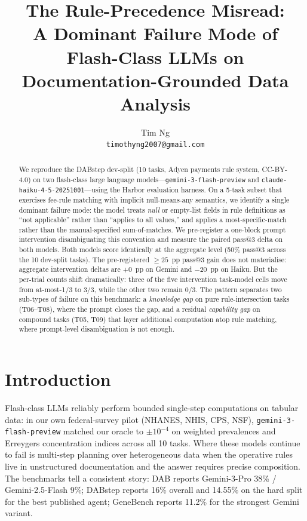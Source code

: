 \documentclass[11pt]{article}
\title{The Rule-Precedence Misread:\\
       A Dominant Failure Mode of Flash-Class LLMs on\\
       Documentation-Grounded Data Analysis}
\author{Tim Ng\\
        \texttt{timothyng2007@gmail.com}}
\date{}
\begin{document}
\maketitle

\begin{abstract}
We reproduce the DABstep dev-split (10 tasks, Adyen payments rule system, CC-BY-4.0) on two
flash-class large language models---\texttt{gemini-3-flash-preview} and
\texttt{claude-haiku-4-5-20251001}---using the Harbor evaluation harness. On a 5-task subset
that exercises fee-rule matching with implicit null-means-any semantics, we identify a single
dominant failure mode: the model treats \emph{null} or empty-list fields in rule definitions
as ``not applicable'' rather than ``applies to all values,'' and applies a most-specific-match
rather than the manual-specified sum-of-matches. We pre-register a one-block prompt
intervention disambiguating this convention and measure the paired pass@3 delta on both models.
Both models score identically at the aggregate level (50\% pass@3 across the 10 dev-split tasks).
The pre-registered $\geq 25$~pp pass@3 gain does not materialise: aggregate intervention deltas
are $+0$~pp on Gemini and $-20$~pp on Haiku. But the per-trial counts shift dramatically: three
of the five intervention task-model cells move from at-most-1/3 to 3/3, while the other two
remain 0/3. The pattern separates two sub-types of failure on this benchmark: a
\emph{knowledge gap} on pure rule-intersection tasks (T06--T08), where the prompt closes the
gap, and a residual \emph{capability gap} on compound tasks (T05, T09) that layer additional
computation atop rule matching, where prompt-level disambiguation is not enough.
\end{abstract}

\section{Introduction}

Flash-class LLMs reliably perform bounded single-step computations on tabular data: in our
own federal-survey pilot (NHANES, NHIS, CPS, NSF), \texttt{gemini-3-flash-preview} matched our
oracle to $\pm 10^{-4}$ on weighted prevalences and Erreygers concentration indices across all
10 tasks. Where these models continue to fail is multi-step planning over heterogeneous data
when the operative rules live in unstructured documentation and the answer requires precise
composition. The benchmarks tell a consistent story: DAB \cite{dab2026} reports
Gemini-3-Pro 38\% / Gemini-2.5-Flash 9\%; DABstep \cite{dabstep2025} reports 16\% overall and
14.55\% on the hard split for the best published agent; GeneBench \cite{genebench2026} reports
11.2\% for the strongest Gemini variant.
\end{document}
